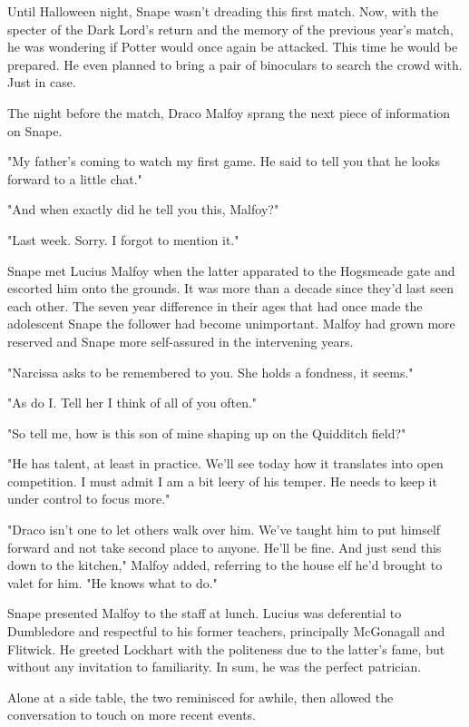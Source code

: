 \documentclass[a4paper,11pt]{article}
\begin{document}
Until Halloween night, Snape wasn't dreading this first match. Now, with the specter of the Dark Lord's return and the memory of the previous year's match, he was wondering if Potter would once again be attacked. This time he would be prepared. He even planned to bring a pair of binoculars to search the crowd with. Just in case.

The night before the match, Draco Malfoy sprang the next piece of information on Snape.

"My father's coming to watch my first game. He said to tell you that he looks forward to a little chat."

"And when exactly did he tell you this, Malfoy?"

"Last week. Sorry. I forgot to mention it."

Snape met Lucius Malfoy when the latter apparated to the Hogsmeade gate and escorted him onto the grounds. It was more than a decade since they'd last seen each other. The seven year difference in their ages that had once made the adolescent Snape the follower had become unimportant. Malfoy had grown more reserved and Snape more self-assured in the intervening years.

"Narcissa asks to be remembered to you. She holds a fondness, it seems."

"As do I. Tell her I think of all of you often."

"So tell me, how is this son of mine shaping up on the Quidditch field?"

"He has talent, at least in practice. We'll see today how it translates into open competition. I must admit I am a bit leery of his temper. He needs to keep it under control to focus more."

"Draco isn't one to let others walk over him. We've taught him to put himself forward and not take second place to anyone. He'll be fine. And just send this down to the kitchen," Malfoy added, referring to the house elf he'd brought to valet for him. "He knows what to do."

Snape presented Malfoy to the staff at lunch. Lucius was deferential to Dumbledore and respectful to his former teachers, principally McGonagall and Flitwick. He greeted Lockhart with the politeness due to the latter's fame, but without any invitation to familiarity. In sum, he was the perfect patrician.

Alone at a side table, the two reminisced for awhile, then allowed the conversation to touch on more recent events.
\end{document}
